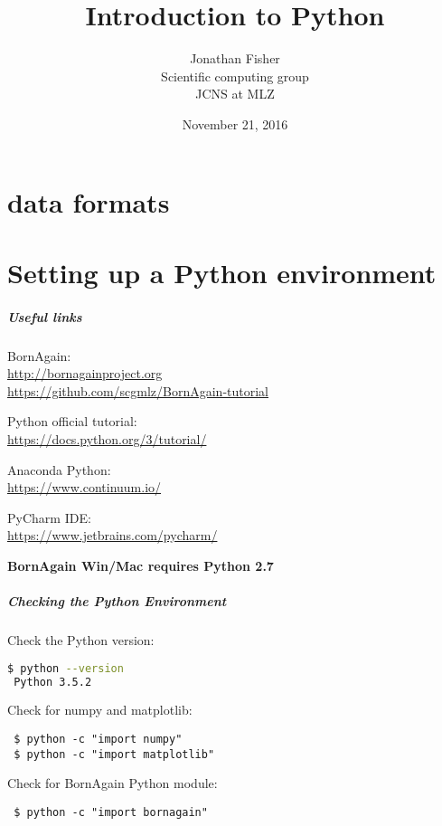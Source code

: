 \documentclass[hyperref={colorlinks, linkcolor=blue, urlcolor=blue}]{beamer}
\title{Introduction to Python}
\author{Jonathan Fisher \\ Scientific computing group \\ JCNS at MLZ}
\date{November  21, 2016}
\begin{document}
\part{data formats} 

\maketitle



\part{Setting up a Python environment} 

\begin{frame}
  \frametitle{Useful links}
  BornAgain: \\
  \url{http://bornagainproject.org} \\
  \url{https://github.com/scgmlz/BornAgain-tutorial}
  \bigskip

  Python official tutorial: \\ \url{https://docs.python.org/3/tutorial/}
  \bigskip

  Anaconda Python: \\ \url{https://www.continuum.io/}
  \bigskip
  
  PyCharm IDE: \\ \url{https://www.jetbrains.com/pycharm/}
  \bigskip

  \textbf{BornAgain Win/Mac requires Python 2.7}
  \end{frame}

\begin{frame}[fragile]
  \frametitle{Checking the Python Environment}

  Check the Python version:
  \begin{lstlisting}[language=bash]
 $ python --version
 Python 3.5.2
  \end{lstlisting}

  Check for numpy and matplotlib:
  \begin{lstlisting}
 $ python -c "import numpy"
 $ python -c "import matplotlib"
  \end{lstlisting}
  
  Check for BornAgain Python module:
    \begin{lstlisting}
 $ python -c "import bornagain"
    \end{lstlisting}

    
\end{frame}
\end{document}
